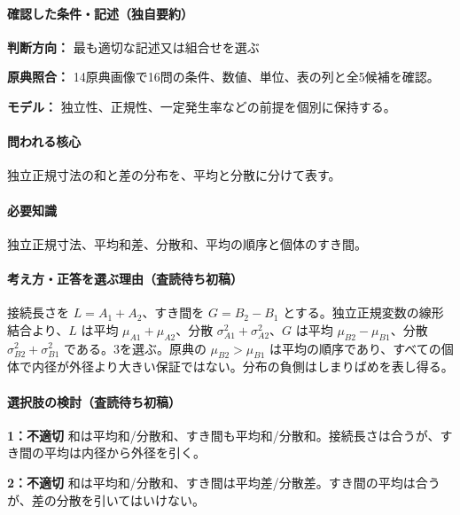 \paragraph{確認した条件・記述（独自要約）}\mbox{}\par

\noindent\textbf{判断方向：} 最も適切な記述又は組合せを選ぶ\par

\noindent\textbf{原典照合：} 14原典画像で16問の条件、数値、単位、表の列と全5候補を確認。\par

\noindent\textbf{モデル：} 独立性、正規性、一定発生率などの前提を個別に保持する。\par

\paragraph{問われる核心} 独立正規寸法の和と差の分布を、平均と分散に分けて表す。

\paragraph{必要知識} 独立正規寸法、平均和差、分散和、平均の順序と個体のすき間。

\paragraph{考え方・正答を選ぶ理由（査読待ち初稿）} 接続長さを \(L=A_1+A_2\)、すき間を \(G=B_2-B_1\) とする。独立正規変数の線形結合より、\(L\) は平均 \(\mu_{A1}+\mu_{A2}\)、分散 \(\sigma_{A1}^2+\sigma_{A2}^2\)、\(G\) は平均 \(\mu_{B2}-\mu_{B1}\)、分散 \(\sigma_{B2}^2+\sigma_{B1}^2\) である。3を選ぶ。原典の \(\mu_{B2}>\mu_{B1}\) は平均の順序であり、すべての個体で内径が外径より大きい保証ではない。分布の負側はしまりばめを表し得る。

\paragraph{選択肢の検討（査読待ち初稿）}\mbox{}\par

\noindent\textbf{1：不適切} 和は平均和/分散和、すき間も平均和/分散和。接続長さは合うが、すき間の平均は内径から外径を引く。\par

\noindent\textbf{2：不適切} 和は平均和/分散和、すき間は平均差/分散差。すき間の平均は合うが、差の分散を引いてはいけない。\par

